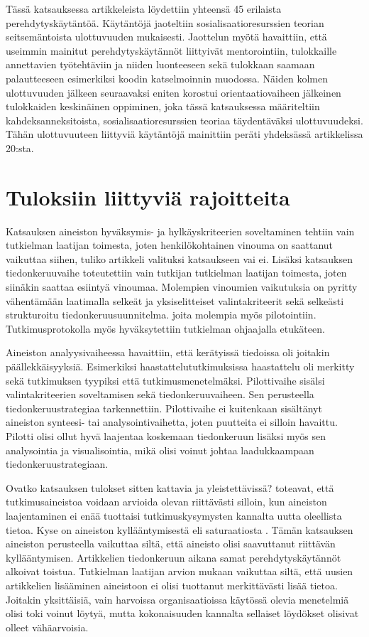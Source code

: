\documentclass[utf8]{gradu3}
\begin{document}
Tässä katsauksessa artikkeleista löydettiin yhteensä 45 erilaista perehdytyskäytäntöä. Käytäntöjä jaoteltiin sosialisaatioresurssien teorian seitsemäntoista ulottuvuuden mukaisesti. Jaottelun myötä havaittiin, että useimmin mainitut perehdytyskäytännöt liittyivät mentorointiin, tulokkaille annettavien työtehtäviin ja niiden luonteeseen sekä tulokkaan saamaan palautteeseen esimerkiksi koodin katselmoinnin muodossa. Näiden kolmen ulottuvuuden jälkeen seuraavaksi eniten korostui orientaatiovaiheen jälkeinen tulokkaiden keskinäinen oppiminen, joka tässä katsauksessa määriteltiin kahdeksanneksitoista, sosialisaatioresurssien teoriaa täydentäväksi ulottuvuudeksi. Tähän ulottuvuuteen liittyviä käytäntöjä mainittiin peräti yhdeksässä artikkelissa 20:sta.


\section{Tuloksiin liittyviä rajoitteita}
\label{luku-rajoitteet}

Katsauksen aineiston hyväksymis- ja hylkäyskriteerien soveltaminen tehtiin vain tutkielman laatijan toimesta, joten henkilökohtainen vinouma on saattanut vaikuttaa siihen, tuliko artikkeli valituksi katsaukseen vai ei. Lisäksi katsauksen tiedonkeruuvaihe toteutettiin vain tutkijan tutkielman laatijan toimesta, joten siinäkin saattaa esiintyä vinoumaa. Molempien vinoumien vaikutuksia on pyritty vähentämään laatimalla selkeät ja yksiselitteiset valintakriteerit sekä selkeästi strukturoitu tiedonkeruusuunnitelma. joita molempia myös pilotointiin. Tutkimusprotokolla myös hyväksytettiin tutkielman ohjaajalla etukäteen.

Aineiston analyysivaiheessa havaittiin, että kerätyissä tiedoissa oli joitakin päällekkäisyyksiä. Esimerkiksi haastattelututkimuksissa haastattelu oli merkitty sekä tutkimuksen tyypiksi että tutkimusmenetelmäksi. Pilottivaihe sisälsi valintakriteerien soveltamisen sekä tiedonkeruuvaiheen. Sen perusteella tiedonkeruustrategiaa tarkennettiin. Pilottivaihe ei kuitenkaan sisältänyt aineiston synteesi- tai analysointivaihetta, joten puutteita ei silloin havaittu. Pilotti olisi ollut hyvä laajentaa koskemaan tiedonkeruun lisäksi myös sen analysointia ja visualisointia, mikä olisi voinut johtaa laadukkaampaan tiedonkeruustrategiaan.

Ovatko katsauksen tulokset sitten kattavia ja yleistettävissä? \textcite{eskola-suoranta-1998} toteavat, että tutkimusaineistoa voidaan arvioida olevan riittävästi silloin, kun aineiston laajentaminen ei enää tuottaisi tutkimuskysymysten kannalta uutta oleellista tietoa. Kyse on aineiston kyllääntymisestä eli saturaatiosta \parencite{eskola-suoranta-1998}. Tämän katsauksen aineiston perusteella vaikuttaa siltä, että aineisto olisi saavuttanut riittävän kyllääntymisen. Artikkelien tiedonkeruun aikana samat perehdytyskäytännöt alkoivat toistua. Tutkielman laatijan arvion mukaan vaikuttaa siltä, että uusien artikkelien lisääminen aineistoon ei olisi tuottanut merkittävästi lisää tietoa. Joitakin yksittäisiä, vain harvoissa organisaatioissa käytössä olevia menetelmiä olisi toki voinut löytyä, mutta kokonaisuuden kannalta sellaiset löydökset olisivat olleet vähäarvoisia. 
\end{document}
